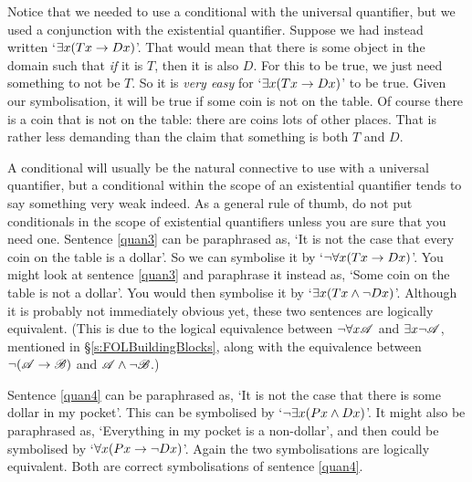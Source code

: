 Notice that we needed to use a conditional with the universal quantifier, but we used a conjunction with the existential quantifier. Suppose we had instead written `$\exists x(Tx \rightarrow Dx)$'. That would mean that there is some object in the domain such that  \emph{if} it is $T$, then it is also $D$. For this to be true, we just need something to not be $T$. So it is \emph{very easy} for `$\exists x(Tx \rightarrow Dx)$' to be true. Given our symbolisation, it will be true if some coin is not on the table. Of course there is a coin that is not on the table: there are coins lots of other places.  That is rather less demanding than the claim that something is both $T$ and $D$.


A conditional will usually be the natural connective to use with a universal quantifier, but a conditional within the scope of an existential quantifier tends to say something very weak indeed. As a general rule of thumb, do not put conditionals in the scope of existential quantifiers unless you are sure that you need one.
Sentence \ref{quan3} can be paraphrased as, `It is not the case that every coin on the table is a dollar'. So we can symbolise it by `$\neg \forall x(Tx \rightarrow Dx)$'. You might look at sentence \ref{quan3} and paraphrase it instead as, `Some coin on the table is not a dollar'. You would then symbolise it by `$\exists x(Tx \wedge \neg Dx)$'. Although it is probably not immediately obvious yet, these two sentences are logically equivalent. (This is due to the logical equivalence between $\neg\forall x\mathscr{A}$ and $\exists x\neg\mathscr{A}$, mentioned in §\ref{s:FOLBuildingBlocks}, along with the equivalence between $\neg(\mathscr{A}\rightarrow\mathscr{B})$ and $\mathscr{A}\wedge\neg\mathscr{B}$.)

Sentence \ref{quan4} can be paraphrased as, `It is not the case that there is some dollar in my pocket'. This can be symbolised by `$\neg\exists x(Px \wedge Dx)$'. It might also be paraphrased as, `Everything in my pocket is a non-dollar', and then could be symbolised by `$\forall x(Px \rightarrow \neg Dx)$'. Again the two symbolisations are logically equivalent. Both are correct symbolisations of sentence \ref{quan4}.


